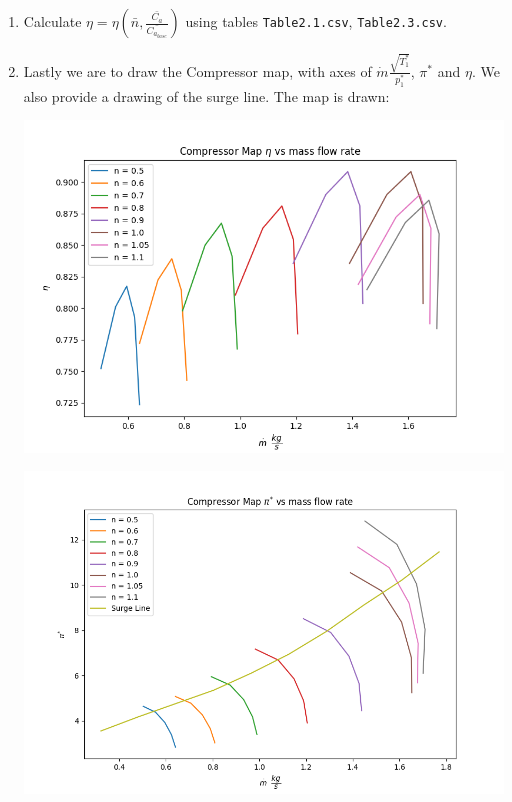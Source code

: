 \documentclass[titlepage]{article}
\begin{document}
\begin{enumerate}
    \item Calculate $\eta = \eta (\bar{n}, \frac{\bar{C_{a}}}{\bar{C_{a_{base}}}})$ using tables \verb|Table2.1.csv|, \verb|Table2.3.csv|.
    
    \item Lastly we are to draw the Compressor map, with axes of $\dot{m} \frac{\sqrt{T^{*}_{1}}}{p^{*}_{1}}$, $\pi^{*}$ and $\eta$. We also provide a drawing of the surge line. The map is drawn:
    
    \begin{center}
        \includegraphics[width=\textwidth]{CompressorMap1.png}

    
        \includegraphics[width=\textwidth]{CompressorMap2.png}


\end{center}
\end{enumerate}
\end{document}

